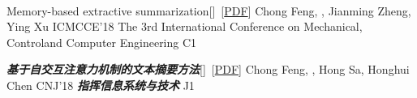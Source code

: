 \documentclass[localFont,alternative]{yaac-another-awesome-cv}
\newcommand{\pdflink}[1]{[\href{https://nudtzpan.github.io/files/#1}{\small{PDF}}]}
\begin{document}
\begin{publications}
	 \\[0.6mm]
	\publication
	{Memory-based extractive summarization}{[\href{https://ieeexplore.ieee.org/document/8537619/}{\small{\linkSymbol}}]~\pdflink{18ICMCCE-MES.pdf}}
	{Chong Feng, \underline{}, Jianming Zheng, Ying Xu}
	{ICMCCE'18} {The 3rd International Conference on Mechanical, Controland Computer Engineering
	} {C1}
	
	\publication
	{\textbf{\textit{基于自交互注意力机制的文本摘要方法}}}{[\href{https://www.cnki.com.cn/Article/CJFDTOTAL-ZHXT201805011.htm}{\small{\linkSymbol}}]~\pdflink{18CNJ-ESSA.pdf}}
	{Chong Feng, \underline{}, Hong Sa, Honghui Chen}
	{CNJ'18} {\textbf{\textit{指挥信息系统与技术}}
	} {J1}

\end{publications}
\end{document}
